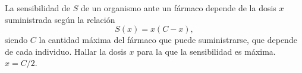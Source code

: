 {La sensibilidad de $S$ de un organismo ante un fármaco depende de la dosis $x$ suministrada según la relación
\[
S(x) = x(C-x),
\]
siendo $C$ la cantidad máxima del fármaco que puede suministrarse, que depende de cada individuo. 
Hallar la dosis $x$ para la que la sensibilidad es máxima. 
}
{$x=C/2$.
}
{
}
